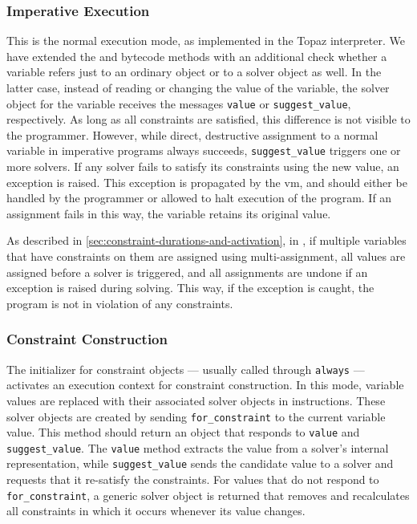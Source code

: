 \subsubsection{Imperative Execution}
This is the normal execution mode, as implemented in the Topaz
interpreter. We have extended the \store and \load bytecode methods with an
additional check whether a variable refers just to an ordinary object
or to a solver object as well. In the latter case, instead of reading or changing the
value of the variable, the solver object for the variable
receives the messages \lstinline{value} or \lstinline{suggest_value},
respectively. As long as all constraints are satisfied, this
difference is not visible to the programmer. However, while direct,
destructive assignment to a normal variable in imperative programs
always succeeds, \lstinline{suggest_value} triggers one or more
solvers. If any solver fails to satisfy its constraints using the new
value, an exception is raised. This exception is propagated by the
\ac{vm}, and should either be handled by the programmer or allowed to
halt execution of the program.  If an assignment
fails in this way, the variable retains its original value.

As described in \autoref{sec:constraint-durations-and-activation}, in
\toolname, if multiple variables that have constraints on them are
assigned using multi-assignment, all values are assigned before a
solver is triggered, and all assignments are undone if an exception is
raised during solving. This way, if the exception is caught, the
program is not in violation of any constraints.

\subsubsection{Constraint Construction}
The initializer for constraint objects --- usually called through
\lstinline{always} --- activates an execution context for constraint
construction. In this mode, variable values are replaced with their
associated solver objects in \load instructions. These solver objects
are created by sending \lstinline{for_constraint} to the current
variable value. This method should return an object that
responds to \lstinline{value} and \lstinline{suggest_value}. 
The \lstinline{value} method extracts the value from a solver's
internal representation, while \lstinline{suggest_value} sends the
candidate value to a solver and requests that it re-satisfy the 
constraints.  For values that do not respond to
\lstinline{for_constraint}, a generic solver object is returned that removes 
and recalculates all constraints in which it occurs whenever its value
changes.

